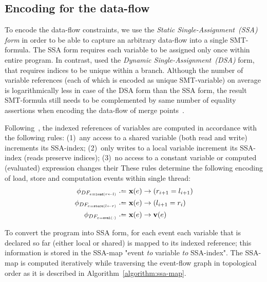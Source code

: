 \subsection{Encoding for the data-flow}
\label{ch:port:enc:df}

To encode the data-flow constraints, we use the \textit{Static Single-Assignment~(SSA) form} in order to be able to capture an arbitrary data-flow into a single SMT-formula.
The SSA form requires each variable to be assigned only once within entire program.
In contrast, \porthos{} used the \textit{Dynamic Single-Assignment~(DSA)} form, that requires indices to be unique within a branch.
Although the number of variable references (each of which is encoded as unique SMT-variable) on average is logarithmically less in case of the DSA form than the SSA form, the result SMT-formula still needs to be complemented by same number of equality assertions when encoding the data-flow of merge points~\cite{Porthos17a}.

Following~\cite{Porthos17b}, the indexed references of variables are computed in accordance with the following rules:
(1)~any access to a shared variable (both read and write) increments its SSA-index;
(2)~only writes to a local variable increment its SSA-index (reads preserve indices);
(3)~no access to a constant variable or computed (evaluated) expression changes their %
These rules determine the following encoding of load, store and computation events within single thread:
%
\begin{align}
    \phi_{DF_{e = \mathtt{load}(r \leftarrow l)}} \defeq \ & \fx(e) \rightarrow (r_{i+1} = l_{i+1}) \\
    \phi_{DF_{e = \mathtt{store}(l \leftarrow r)}} \defeq \ & \fx(e) \rightarrow (l_{i+1} = r_i) \\
    \phi_{DF_{e = \mathtt{eval}(\cdot)}} \defeq \ & \fx(e) \rightarrow \fv(e) %
\end{align}

To convert the program into SSA form, for each event each variable that is declared so far (either local or shared) is mapped to its indexed reference; this information is stored in the SSA-map "event \textit{to} variable \textit{to} SSA-index". %
The SSA-map is computed iteratively while traversing the event-flow graph in topological order as it is described in Algorithm~\ref{algorithm:ssa-map}.


